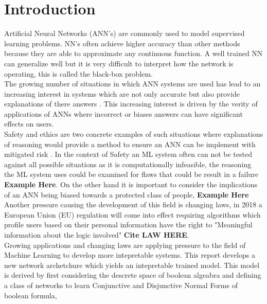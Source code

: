 \chapter{Introduction}\label{C:intro}
Artificial Neural Networks (ANN's) are commonly used to model supervised learning problems. NN's often achieve higher accuracy than other methods because they are able to approximate any continuous function. A well trained NN can generalize well but it is very difficult to interpret how the network is operating, this is called the black-box problem. \\

The growing number of situations in which ANN systems are used has lead to an increasing interest in systems which are not only accurate but also provide explanations of there answers \cite{doshi2017towards}. This increasing interest is driven by the verity of applications of ANNs where incorrect or biases answers can have significant effects on users.\\

Safety and ethics are two concrete examples of such situations where explanations of reasoning would provide a method to ensure an ANN can be implement with mitigated risk \cite{doshi2017towards}. In the context of Safety an ML system often can not be tested against all possible situations as it is computationally infeasible, the reasoning the ML system uses could be examined for flaws that could be result in a failure \textbf{Example Here}. On the other hand it is important to consider the implications of an ANN being biased towards a protected class of people, \textbf{Example Here}\\

Another pressure causing the development of this field is changing laws, in 2018 a European Union (EU) regulation will come into effect requiring algorithms which  profile users based on their personal information have the right to "Meaningful information about the logic involved" \cite{goodman2016european} \textbf{Cite LAW HERE}.\\

Growing applications and changing laws are applying pressure to the field of Machine Learning to develop more intepretable systems. This report develops a new network archetchure which yields an intepretable trained model. This model is derived by first considering the descrete space of boolean algeabra and defining a class of networks to learn Conjunctive and Disjunctive Normal Forms of boolean formula,

